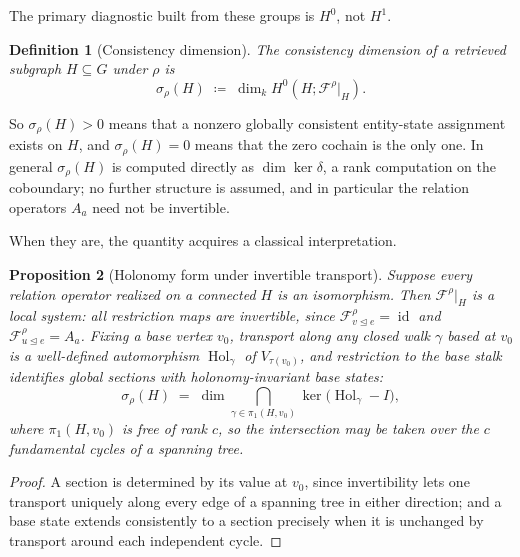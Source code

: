 \documentclass[11pt]{article}
\newtheorem{definition}{Definition}[section]
\newtheorem{proposition}[definition]{Proposition}
\newcommand{\id}{\operatorname{id}}
\newcommand{\F}{\mathcal{F}}
\begin{document}
The primary diagnostic built from these groups is $H^0$, not $H^1$.

\begin{definition}[Consistency dimension]
\label{def:consistency-dim}
The \emph{consistency dimension} of a retrieved subgraph $H\subseteq G$ under $\rho$ is
\[
\sigma_\rho(H)\;\coloneqq\;\dim_k H^0(H;\F^{\rho}|_H).
\]
\end{definition}

So $\sigma_\rho(H)>0$ means that a nonzero globally consistent entity-state assignment exists on $H$, and $\sigma_\rho(H)=0$ means that the zero cochain is the only one. In general $\sigma_\rho(H)$ is computed directly as $\dim\ker\delta$, a rank computation on the coboundary; no further structure is assumed, and in particular the relation operators $A_a$ need not be invertible.

When they are, the quantity acquires a classical interpretation.

\begin{proposition}[Holonomy form under invertible transport]
\label{prop:holonomy}
Suppose every relation operator realized on a connected $H$ is an isomorphism. Then $\F^{\rho}|_H$ is a local system: all restriction maps are invertible, since $\F^{\rho}_{v\unlhd e}=\id$ and $\F^{\rho}_{u\unlhd e}=A_a$. Fixing a base vertex $v_0$, transport along any closed walk $\gamma$ based at $v_0$ is a well-defined automorphism $\operatorname{Hol}_\gamma$ of $V_{\tau(v_0)}$, and restriction to the base stalk identifies global sections with holonomy-invariant base states:
\[
\sigma_\rho(H)\;=\;\dim\!\!\bigcap_{\gamma\in\pi_1(H,v_0)}\!\!\ker\bigl(\operatorname{Hol}_\gamma-I\bigr),
\]
where $\pi_1(H,v_0)$ is free of rank $c$, so the intersection may be taken over the $c$ fundamental cycles of a spanning tree.
\end{proposition}
\begin{proof}
A section is determined by its value at $v_0$, since invertibility lets one transport uniquely along every edge of a spanning tree in either direction; and a base state extends consistently to a section precisely when it is unchanged by transport around each independent cycle.
\end{proof}
\end{document}
